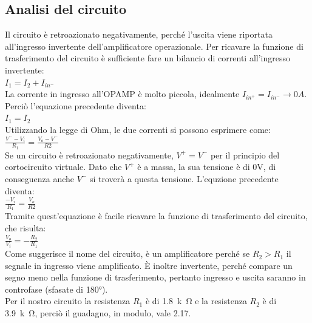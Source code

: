 \documentclass{report}
\begin{document}
\subsection{Analisi del circuito} \label{amplinv_analisi_cap}
Il circuito è retroazionato negativamente, perché l'uscita viene riportata all'ingresso invertente dell'amplificatore operazionale. Per ricavare la funzione di trasferimento del circuito è sufficiente fare un bilancio di correnti all'ingresso invertente:
\\[2pt]\indent $I_1=I_2+I_{in^-}$
\\[2pt]La corrente in ingresso all'OPAMP è molto piccola, idealmente $I_{in^+}=I_{in^-}\rightarrow 0A$. Perciò l'equazione precedente diventa:
\\\indent $\displaystyle{I_1=I_2}$
\\Utilizzando la legge di Ohm, le due correnti si possono esprimere come:
\\[2pt]\indent $\displaystyle{\frac{V^--V_i}{R_1}=\frac{V_o-V^-}{R2}}$
\\[2pt]Se un circuito è retroazionato negativamente, $V^+=V^-$ per il principio del cortocircuito virtuale. Dato che $V^+$ è a massa, la sua tensione è di 0V, di conseguenza anche $V^-$ si troverà a questa tensione. L'equzione precedente diventa:
\\[2pt]\indent $\displaystyle{\frac{-V_i}{R_1}=\frac{V_o}{R2}}$
\\[2pt]Tramite quest'equazione è facile ricavare la funzione di trasferimento del circuito, che risulta:
\\[2pt]\indent $\displaystyle{\frac{V_o}{V_i}=-\frac{R_2}{R_1}}$
\\[2pt]Come suggerisce il nome del circuito, è un amplificatore perché se $R_2>R_1$ il segnale in ingresso viene amplificato. È inoltre invertente, perché compare un segno meno nella funzione di trasferimento, pertanto ingresso e uscita saranno in controfase (sfasate di 180°).
\\Per il nostro circuito la resistenza $R_1$ è di \SI{1.8}{k\ohm} e la resistenza $R_2$ è di \SI{3.9}{k\ohm}, perciò il guadagno, in modulo, vale 2.17.
\end{document}
